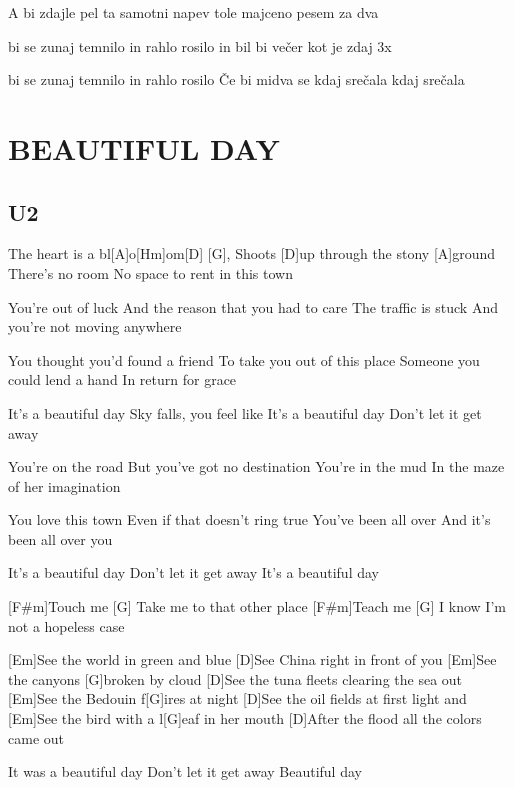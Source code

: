 \documentclass{article}
\begin{document}
\begin{multicols}{2}
\begin{guitar}
	A bi zdajle pel ta samotni napev
	tole majceno pesem za dva

	bi se zunaj temnilo in rahlo rosilo  
	in bil bi večer kot je zdaj	\qquad	3x 

	bi se zunaj temnilo in rahlo rosilo  
	Če bi midva se kdaj srečala
	kdaj srečala
	
\end{guitar}

\section*{BEAUTIFUL DAY}
%
\subsection*{U2}
\begin{guitar}



		
	The heart is a bl[A]o[Hm]om[D] [G],
	Shoots [D]up through the stony [A]ground
	There's no room
	No space to rent in this town

	You're out of luck
	And the reason that you had to care
	The traffic is stuck
	And you're not moving anywhere

	You thought you'd found a friend
	To take you out of this place
	Someone you could lend a hand
	In return for grace

	It's a beautiful day
	Sky falls, you feel like
	It's a beautiful day
	Don't let it get away

	You're on the road
	But you've got no destination
	You're in the mud
	In the maze of her imagination

	You love this town
	Even if that doesn't ring true
	You've been all over
	And it's been all over you

	It's a beautiful day
	Don't let it get away
	It's a beautiful day

	[F#m]Touch me [G] 
	Take me to that other place
	[F#m]Teach me [G] 
	I know I'm not a hopeless case

	[Em]See the world in green and blue
	[D]See China right in front of you
	[Em]See the canyons [G]broken by cloud
	[D]See the tuna fleets clearing the sea out
	[Em]See the Bedouin f[G]ires at night
	[D]See the oil fields at first light and
	[Em]See the bird with a l[G]eaf in her mouth
	[D]After the flood all the colors came out

	It was a beautiful day
	Don't let it get away
	Beautiful day


\end{guitar}
\end{multicols}
\end{document}
